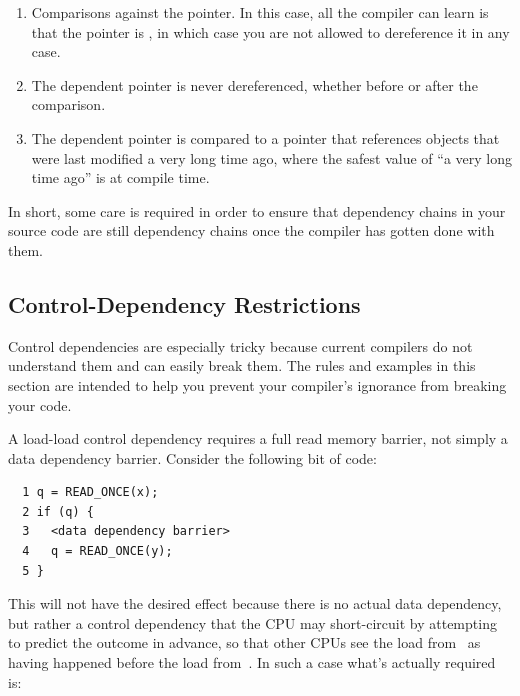 \begin{enumerate}
\item	Comparisons against the  pointer.
	In this case, all the compiler can learn is that the pointer
	is , in which case you are not allowed to
	dereference it in any case.
\item	The dependent pointer is never dereferenced, whether before or
	after the comparison.
\item	The dependent pointer is compared to a pointer that references
	objects that were last modified a very long time ago, where
	the safest value of ``a very long time ago'' is at compile time.
\end{enumerate}



In short, some care is required in order to ensure that dependency
chains in your source code are still dependency chains once the
compiler has gotten done with them.

\subsection{Control-Dependency Restrictions}
\label{sec:memorder:Control-Dependency Restrictions}

Control dependencies are especially tricky because current compilers
do not understand them and can easily break them.
The rules and examples in this section are intended to help you
prevent your compiler's ignorance from breaking your code.

A load-load control dependency requires a full read memory barrier,
not simply a data dependency barrier.
Consider the following bit of code:

\vspace{5pt}
\begin{minipage}[t]{\columnwidth}
\scriptsize
\begin{verbatim}
  1 q = READ_ONCE(x);
  2 if (q) {
  3   <data dependency barrier>
  4   q = READ_ONCE(y);
  5 }
\end{verbatim}
\end{minipage}
\vspace{5pt}

This will not have the desired effect because there is no actual data
dependency, but rather a control dependency that the CPU may short-circuit
by attempting to predict the outcome in advance, so that other CPUs see
the load from~ as having happened before the load from~.
In such a case what's actually required is:

